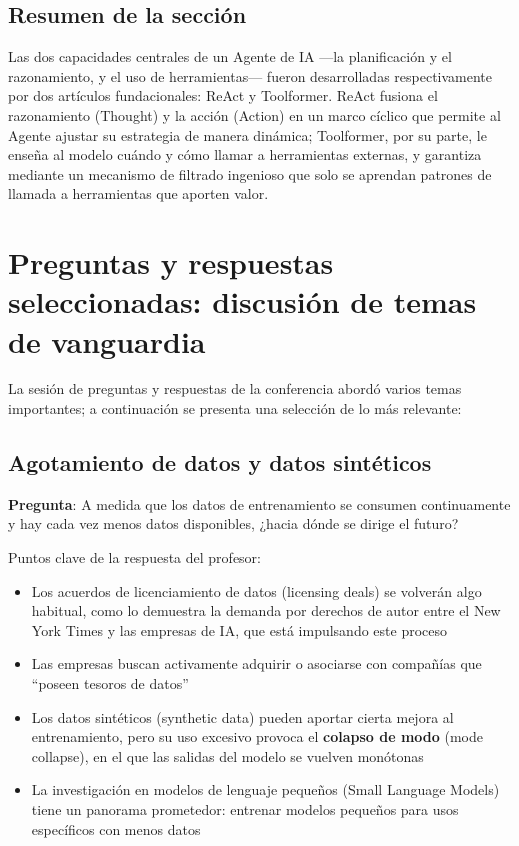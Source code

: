 \documentclass[a4paper]{article}
\begin{document}
\subsection{Resumen de la sección}

Las dos capacidades centrales de un Agente de IA —la planificación y el razonamiento, y el uso de herramientas— fueron desarrolladas respectivamente por dos artículos fundacionales: ReAct y Toolformer. ReAct fusiona el razonamiento (Thought) y la acción (Action) en un marco cíclico que permite al Agente ajustar su estrategia de manera dinámica; Toolformer, por su parte, le enseña al modelo cuándo y cómo llamar a herramientas externas, y garantiza mediante un mecanismo de filtrado ingenioso que solo se aprendan patrones de llamada a herramientas que aporten valor.
\section{Preguntas y respuestas seleccionadas: discusión de temas de vanguardia}

La sesión de preguntas y respuestas de la conferencia abordó varios temas importantes; a continuación se presenta una selección de lo más relevante:

\subsection{Agotamiento de datos y datos sintéticos}

\textbf{Pregunta}: A medida que los datos de entrenamiento se consumen continuamente y hay cada vez menos datos disponibles, ¿hacia dónde se dirige el futuro?

Puntos clave de la respuesta del profesor:
\begin{itemize}
    \item Los acuerdos de licenciamiento de datos (licensing deals) se volverán algo habitual, como lo demuestra la demanda por derechos de autor entre el New York Times y las empresas de IA, que está impulsando este proceso
    \item Las empresas buscan activamente adquirir o asociarse con compañías que ``poseen tesoros de datos''
    \item Los datos sintéticos (synthetic data) pueden aportar cierta mejora al entrenamiento, pero su uso excesivo provoca el \textbf{colapso de modo} (mode collapse), en el que las salidas del modelo se vuelven monótonas
    \item La investigación en modelos de lenguaje pequeños (Small Language Models) tiene un panorama prometedor: entrenar modelos pequeños para usos específicos con menos datos
\end{itemize}
\end{document}
